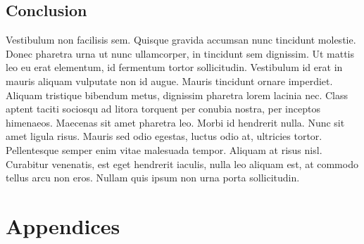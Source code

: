 \documentclass[a4paper,12pt]{article}
\begin{document}
\begin{multicols}{2}
	\section{Conclusion}
		Vestibulum non facilisis sem. Quisque gravida accumsan nunc tincidunt molestie. Donec pharetra urna ut nunc ullamcorper, in tincidunt sem dignissim. Ut mattis leo eu erat elementum, id fermentum tortor sollicitudin. Vestibulum id erat in mauris aliquam vulputate non id augue. Mauris tincidunt ornare imperdiet. Aliquam tristique bibendum metus, dignissim pharetra lorem lacinia nec. Class aptent taciti sociosqu ad litora torquent per conubia nostra, per inceptos himenaeos. Maecenas sit amet pharetra leo. Morbi id hendrerit nulla. Nunc sit amet ligula risus. Mauris sed odio egestas, luctus odio at, ultricies tortor. Pellentesque semper enim vitae malesuada tempor. Aliquam at risus nisl. Curabitur venenatis, est eget hendrerit iaculis, nulla leo aliquam est, at commodo tellus arcu non eros. Nullam quis ipsum non urna porta sollicitudin.
		
\end{multicols}

\newpage
\begin{thebibliography}{}
	
	
\end{thebibliography}

	

\newpage

\section*{Appendices}
	
	
\end{document}
